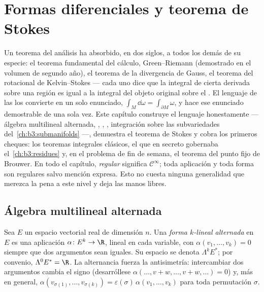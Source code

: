 \chapter{Formas diferenciales y teorema de Stokes}\label{ch:b3:forms}

Un teorema del análisis ha absorbido, en dos siglos, a todos los demás
de su especie: el teorema fundamental del cálculo, Green--Riemann
(demostrado en el volumen de segundo año), el teorema de la divergencia
de Gauss, el teorema del rotacional de Kelvin--Stokes --- cada uno dice
que la integral de cierta derivada sobre una región es igual a la
integral del objeto original sobre el
. El lenguaje de las
\emph{} los
convierte en un solo enunciado,
$\int_M\dd\omega = \int_{\partial M}\omega$, y hace ese enunciado
demostrable de una sola vez. Este capítulo construye el lenguaje
honestamente --- álgebra multilineal alternada,
,
,
, integración sobre las
subvariedades del~\cref{ch:b3:submanifolds} ---, demuestra el teorema de
Stokes y cobra los primeros cheques: los teoremas integrales clásicos,
el  que en secreto gobernaba
el~\cref{ch:b3:residues} y, en el problema de fin de semana, el teorema
del punto fijo de Brouwer. En todo el capítulo, \emph{regular} significa
$\mathcal
C^\infty$; toda aplicación y toda forma son regulares salvo mención
expresa. Esto no cuesta ninguna generalidad que merezca la pena a este
nivel y deja las manos libres.

\section{Álgebra multilineal alternada}

\begin{definition}\label{def:b3:forms:alternating}
Sea $E$ un espacio vectorial real de dimensión $n$. Una \emph{forma
$k$-lineal alternada} en $E$ es una aplicación
$\alpha\colon E^k \to \R$, lineal en cada variable, con
$\alpha(v_1, \dots, v_k) = 0$ siempre que dos argumentos sean iguales.
Su espacio se denota $\Lambda^k E^*$; por convenio, $\Lambda^0E^* = \R$.
La alternancia fuerza la antisimetría: intercambiar dos argumentos
cambia el signo (desarróllese
$\alpha(\dots, v + w, \dots, v + w, \dots) = 0$) y, más en general,
$\alpha(v_{\sigma(1)}, \dots, v_{\sigma(k)}) =
\varepsilon(\sigma)\,\alpha(v_1, \dots, v_k)$ para toda permutación
$\sigma$.
\end{definition}

